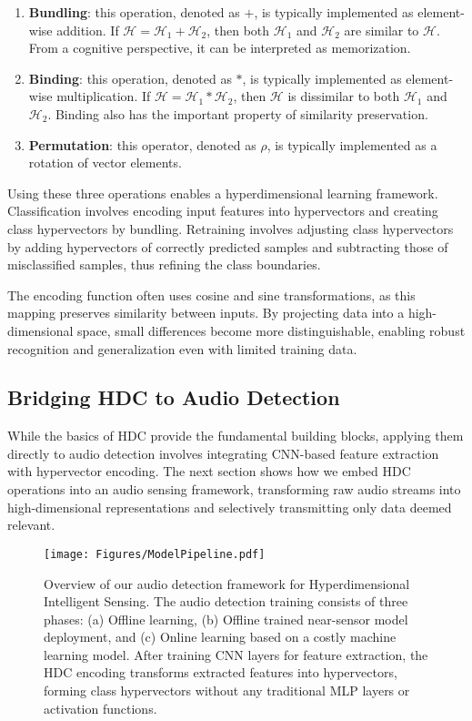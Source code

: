 \begin{enumerate}
    \item \textbf{Bundling}: this operation, denoted as $+$, is typically implemented as element-wise addition. If $\mathcal{H}=\mathcal{H}_1+\mathcal{H}_2$, then both $\mathcal{H}_1$ and $\mathcal{H}_2$ are similar to $\mathcal{H}$. From a cognitive perspective, it can be interpreted as memorization.
    \item \textbf{Binding}: this operation, denoted as $*$, is typically implemented as element-wise multiplication. If $\mathcal{H}=\mathcal{H}_1*\mathcal{H}_2$, then $\mathcal{H}$ is dissimilar to both $\mathcal{H}_1$ and $\mathcal{H}_2$. Binding also has the important property of similarity preservation.
    \item \textbf{Permutation}: this operator, denoted as $\rho$, is typically implemented as a rotation of vector elements.
\end{enumerate}

Using these three operations enables a hyperdimensional learning framework. Classification involves encoding input features into hypervectors and creating class hypervectors by bundling. Retraining involves adjusting class hypervectors by adding hypervectors of correctly predicted samples and subtracting those of misclassified samples, thus refining the class boundaries.

The encoding function often uses cosine and sine transformations, as this mapping preserves similarity between inputs. By projecting data into a high-dimensional space, small differences become more distinguishable, enabling robust recognition and generalization even with limited training data.


\subsection{Bridging HDC to Audio Detection}
While the basics of HDC provide the fundamental building blocks, applying them directly to audio detection involves integrating CNN-based feature extraction with hypervector encoding. The next section shows how we embed HDC operations into an audio sensing framework, transforming raw audio streams into high-dimensional representations and selectively transmitting only data deemed relevant.

\begin{figure*}[t!]
  \centering
  \texttt{[image: Figures/ModelPipeline.pdf]}
  \caption{Overview of our audio detection framework for Hyperdimensional Intelligent Sensing. The audio detection training consists of three phases: (a) Offline learning, (b) Offline trained near-sensor model deployment, and (c) Online learning based on a costly machine learning model. After training CNN layers for feature extraction, the HDC encoding transforms extracted features into hypervectors, forming class hypervectors without any traditional MLP layers or activation functions.}
  \label{Fig:model_pipeline}
\end{figure*}


